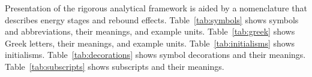 
Presentation of the rigorous analytical framework is aided by a 
nomenclature that describes energy stages and rebound effects.
Table~\ref{tab:symbols} shows symbols and abbreviations, their meanings, and example units.
Table~\ref{tab:greek} shows Greek letters, their meanings, and example units.
Table~\ref{tab:initialisms} shows initialisms.
Table~\ref{tab:decorations} shows symbol decorations and their meanings.
Table~\ref{tab:subscripts} shows subscripts and their meanings.



